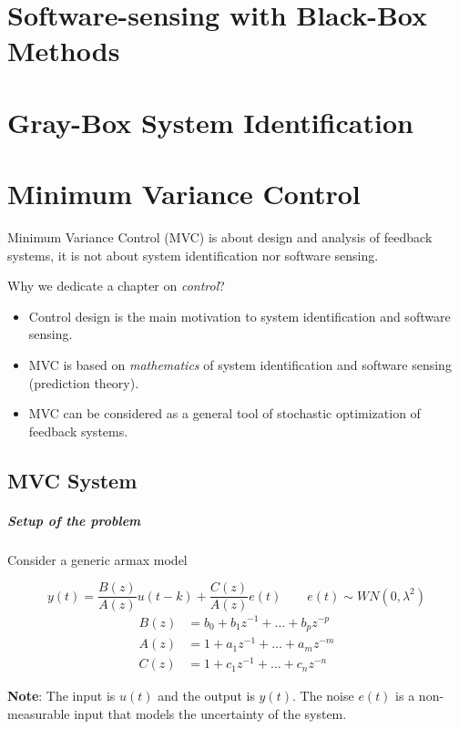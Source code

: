 
\chapter{Software-sensing with Black-Box Methods}


\chapter{Gray-Box System Identification}


\chapter{Minimum Variance Control}
Minimum Variance Control (MVC) is about design and analysis of feedback systems, it is not about system identification nor software sensing.

Why we dedicate a chapter on \emph{control}?
\begin{itemize}
    \item Control design is the main motivation to system identification and software sensing.
    \item MVC is based on \emph{mathematics} of system identification and software sensing (prediction theory).
    \item MVC can be considered as a general tool of stochastic optimization of feedback systems.
\end{itemize}

\section{MVC System}

\paragraph{Setup of the problem} Consider a generic \gls{armax} model

\begin{recall}
	\[
	    y(t) = \frac{B(z)}{A(z)}u(t-k) + \frac{C(z)}{A(z)}e(t) \qquad e(t) \sim WN(0, \lambda^2)
	\]
	\begin{align*}
	    B(z) &= b_0 + b_1z^{-1} + \dots + b_pz^{-p} \\
	    A(z) &= 1   + a_1z^{-1} + \dots + a_mz^{-m} \\
	    C(z) &= 1   + c_1z^{-1} + \dots + c_nz^{-n}
	\end{align*}

	\textbf{Note}: The input is $u(t)$ and the output is $y(t)$. The noise $e(t)$ is a non-measurable input that models the uncertainty of the system.  
\end{recall}


